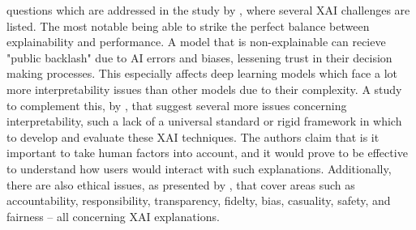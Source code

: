 questions which are addressed in the study by \cite{yakandawala2023review}, where several XAI challenges are listed. The most notable being able to strike the perfect balance between explainability and performance. A model that is non-explainable can recieve "public backlash" due to AI errors and biases, lessening trust in their decision making processes. This especially affects deep learning models which face a lot more interpretability issues than other models due to their complexity. A study to complement this, by \cite{reddy2023explainable}, that suggest several more issues concerning interpretability, such a lack of a universal standard or rigid framework in which to develop and evaluate these XAI techniques. The authors claim that is it important to take human factors into account, and it would prove to be effective to understand how users would interact with such explanations. Additionally, there are also ethical issues, as presented by \cite{hanif2021survey}, that cover areas such as accountability, responsibility, transparency, fidelty, bias, casuality, safety, and fairness -- all concerning XAI explanations.
